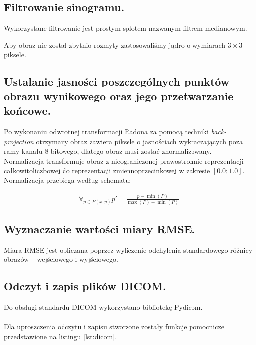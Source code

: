 \documentclass[a4paper, 11pt]{article}
\begin{document}
\subsection{Filtrowanie sinogramu.}

Wykorzystane filtrowanie jest prostym splotem nazwanym filtrem medianowym.


Aby obraz nie został zbytnio rozmyty zastosowaliśmy jądro o wymiarach $3\times3$  piksele.

\subsection{Ustalanie jasności poszczególnych punktów obrazu wynikowego oraz jego przetwarzanie końcowe.}

Po wykonaniu odwrotnej transformacji Radona za pomocą techniki \textit{back-projection} otrzymany obraz zawiera piksele o
jasnościach wykraczających poza ramy kanału 8-bitowego, dlatego obraz musi zostać znormalizowany.\\


Normalizacja transformuje obraz z nieograniczonej prawostronnie reprezentacji całkowitoliczbowej do reprezentacji
zmiennoprzecinkowej w zakresie $\left[0.0;1.0\right]$. Normalizacja przebiega według schematu:

\begin{align*}
	\forall_{p \in P(x, y)} p' = \frac{p - \min(P)}{\max(P) - \min(P)}
\end{align*}

\subsection{Wyznaczanie wartości miary RMSE.}

Miara RMSE jest obliczana poprzez wyliczenie odchylenia standardowego różnicy obrazów -- wejściowego i wyjściowego.

\subsection{Odczyt i zapis plików DICOM.}

Do obsługi standardu DICOM wykorzystano bibliotekę Pydicom.\\
\\
Dla uproszczenia odczytu i zapisu stworzone zostały funkcje pomocnicze przedstawione na listingu \ref{lst:dicom}.
\end{document}
